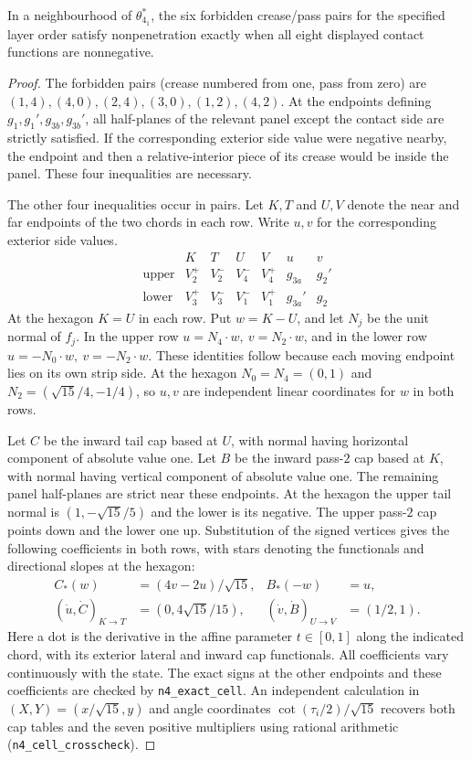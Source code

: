 \begin{lemma}\label{lem:hex-cell}
In a neighbourhood of $\theta^*_{4_1}$, the six forbidden crease/pass pairs for the specified layer order satisfy nonpenetration exactly when all eight displayed contact functions are nonnegative.
\end{lemma}

\begin{proof}
The forbidden pairs (crease numbered from one, pass from zero) are $(1,4),(4,0),(2,4),(3,0),(1,2),(4,2)$. At the endpoints defining $g_1,g_1',g_{3b},g_{3b}'$, all half-planes of the relevant panel except the contact side are strictly satisfied. If the corresponding exterior side value were negative nearby, the endpoint and then a relative-interior piece of its crease would be inside the panel. These four inequalities are necessary.

The other four inequalities occur in pairs. Let $K,T$ and $U,V$ denote the near and far endpoints of the two chords in each row. Write $u,v$ for the corresponding exterior side values.
\[
\begin{array}{c|cc|cc|cc}
 &K&T&U&V&u&v\\ \hline
 \text{upper}&V_2^+&V_2^-&V_4^-&V_4^+&g_{3a}&g_2'\\
 \text{lower}&V_3^+&V_3^-&V_1^-&V_1^+&g_{3a}'&g_2
\end{array}
\]
At the hexagon $K=U$ in each row. Put $w=K-U$, and let $N_j$ be the unit normal of $f_j$. In the upper row $u=N_4\cdot w,\ v=N_2\cdot w$, and in the lower row $u=-N_0\cdot w,\ v=-N_2\cdot w$. These identities follow because each moving endpoint lies on its own strip side. At the hexagon $N_0=N_4=(0,1)$ and $N_2=(\sqrt{15}/4,-1/4)$, so $u,v$ are independent linear coordinates for $w$ in both rows.

Let $C$ be the inward tail cap based at $U$, with normal having horizontal component of absolute value one. Let $B$ be the inward pass-$2$ cap based at $K$, with normal having vertical component of absolute value one. The remaining panel half-planes are strict near these endpoints. At the hexagon the upper tail normal is $(1,-\sqrt{15}/5)$ and the lower is its negative. The upper pass-$2$ cap points down and the lower one up. Substitution of the signed vertices gives the following coefficients in both rows, with stars denoting the functionals and directional slopes at the hexagon:
\[
\begin{aligned}
 C_*(w)&=(4v-2u)/\sqrt{15}, & B_*(-w)&=u,\\
 (\dot u,\dot C)_{K\to T}&=(0,4\sqrt{15}/15),&
 (\dot v,\dot B)_{U\to V}&=(1/2,1).
\end{aligned}
\]
Here a dot is the derivative in the affine parameter $t\in[0,1]$ along the indicated chord, with its exterior lateral and inward cap functionals. All coefficients vary continuously with the state. The exact signs at the other endpoints and these coefficients are checked by \texttt{n4\_exact\_cell}. An independent calculation in $(X,Y)=(x/\sqrt{15},y)$ and angle coordinates $\cot(\tau_i/2)/\sqrt{15}$ recovers both cap tables and the seven positive multipliers using rational arithmetic (\texttt{n4\_cell\_crosscheck}).


\end{proof}
